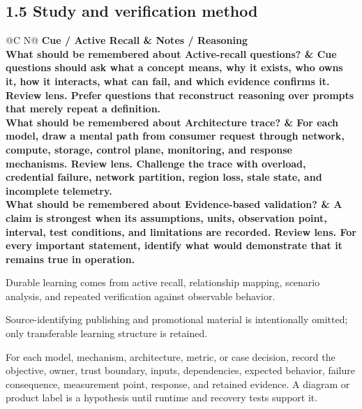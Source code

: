 \documentclass[11pt]{article}
\newcommand{\CornellHeader}{\rowcolor{Navy}\color{white}\bfseries Cue / Active Recall & \color{white}\bfseries Notes / Reasoning \\\endhead}
\newcommand{\CornellRow}[2]{\cellcolor{CueGray}\textbf{#1} & #2 \\\addlinespace[3pt]}
\begin{document}
\subsection{1.5 Study and verification method}
\begin{longtable}{@{}C N@{}}
\CornellHeader
\CornellRow{What should be remembered about Active-recall questions?}{Cue questions should ask what a concept means, why it exists, who owns it, how it interacts, what can fail, and which evidence confirms it. \textbf{Review lens.} Prefer questions that reconstruct reasoning over prompts that merely repeat a definition.}
\CornellRow{What should be remembered about Architecture trace?}{For each model, draw a mental path from consumer request through network, compute, storage, control plane, monitoring, and response mechanisms. \textbf{Review lens.} Challenge the trace with overload, credential failure, network partition, region loss, stale state, and incomplete telemetry.}
\CornellRow{What should be remembered about Evidence-based validation?}{A claim is strongest when its assumptions, units, observation point, interval, test conditions, and limitations are recorded. \textbf{Review lens.} For every important statement, identify what would demonstrate that it remains true in operation.}
\end{longtable}
\begin{sectionsummarybox}
Durable learning comes from active recall, relationship mapping, scenario analysis, and repeated verification against observable behavior.
\end{sectionsummarybox}
\begin{scopenotebox}
Source-identifying publishing and promotional material is intentionally omitted; only transferable learning structure is retained.
\end{scopenotebox}
\begin{practicebox}
For each model, mechanism, architecture, metric, or case decision, record the objective, owner, trust boundary, inputs, dependencies, expected behavior, failure consequence, measurement point, response, and retained evidence. A diagram or product label is a hypothesis until runtime and recovery tests support it.
\end{practicebox}
\end{document}
